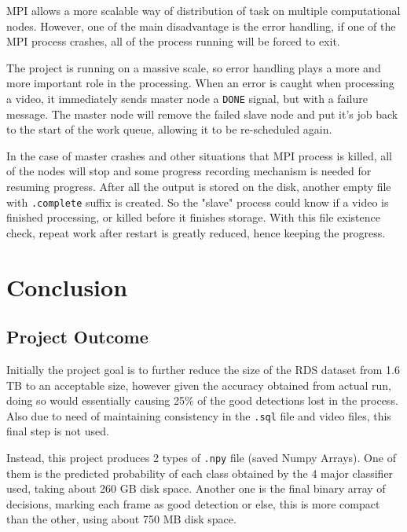 \documentclass[bsc,logo,twoside,fullspacing,parskip]{infthesis}
\begin{document}
MPI allows a more scalable way of distribution of task on multiple computational nodes.
However, one of the main disadvantage is the error handling, if one of the MPI process crashes, all of the process running will be forced to exit.

The project is running on a massive scale, so error handling plays a more and more important role in the processing. 
When an error is caught when processing a video, it immediately sends master node a {\tt DONE} signal, but with a failure message. The master node will remove the failed slave node and put it's job back to the start of the work queue, allowing it to be re-scheduled again.

In the case of master crashes and other situations that MPI process is killed, all of the nodes will stop and some progress recording mechanism is needed for resuming progress. After all the output is stored on the disk, another empty file with {\tt .complete} suffix is created. So the "slave" process could know if a video is finished processing, or killed before it finishes storage. With this file existence check, repeat work after restart is greatly reduced, hence keeping the progress.

\newpage

\chapter{Conclusion}
\label{chap:conclusion}

\section{Project Outcome}

Initially the project goal is to further reduce the size of the RDS dataset from 1.6 TB to an acceptable size, however given the accuracy obtained from actual run, doing so would essentially causing 25\% of the good detections lost in the process. Also due to need of maintaining consistency in the {\tt .sql} file and video files, this final step is not used.

Instead, this project produces 2 types of {\tt .npy} file (saved Numpy Arrays). 
One of them is the predicted probability of each class obtained by the 4 major classifier used, taking about 260 GB disk space. 
Another one is the final binary array of decisions, marking each frame as good detection or else, this is more compact than the other, using about 750 MB disk space.
\end{document}
